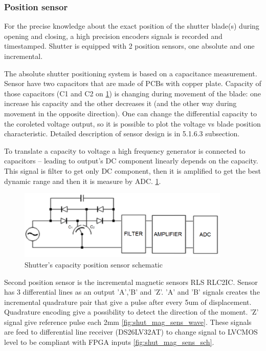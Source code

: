 \subsubsection{Position sensor}

For the precise knowledge about the exact position of the shutter blade(s) during opening and closing, a high precision encoders signals is recorded and timestamped. Shutter is equipped with 2 position sensors, one absolute and one incremental.

The absolute shutter positioning system is based on a capacitance measurement. Sensor have two capacitors that are made of PCBs with copper plate. Capacity of those capacitors (C1 and C2 on \ref{fig:shutsens}) is changing during movement of the blade: one increase his capacity and the other decreases it (and the other way during movement in the opposite direction). One can change the differential capacity to the coroleted voltage output, so it is possible to plot the voltage vs blade position characteristic. Detailed description of sensor design is in 5.1.6.3 subsection.

To translate a capacity to voltage a high frequency generator is connected to capacitors – leading to output's DC component linearly depends on the capacity. This signal is filter to get only DC component, then it is amplified to get the best dynamic range and then it is measure by ADC. \ref{fig:shutsens}.

\begin{figure}[H]
\centering
\includegraphics[width=0.9\textwidth]{pict/shut_sens.png}
\caption{Shutter's capacity position sensor schematic}
\label{fig:shutsens}
\end{figure}

Second position sensor is the incremental magnetic sensors RLS RLC2IC. Sensor has 3 differential lines as an output 'A','B' and 'Z'. 'A' and 'B' signals creates the incremental quadrature pair that give a pulse after every 5um of displacement. Quadrature encoding give a possibility to detect the direction of the moment. 'Z' signal give reference pulse each 2mm \ref{fig:shut_mag_sens_wave}. These signals are feed to differential line receiver (DS26LV32AT) to change signal to LVCMOS level to be compliant with FPGA inputs \ref{fig:shut_mag_sens_sch}.

